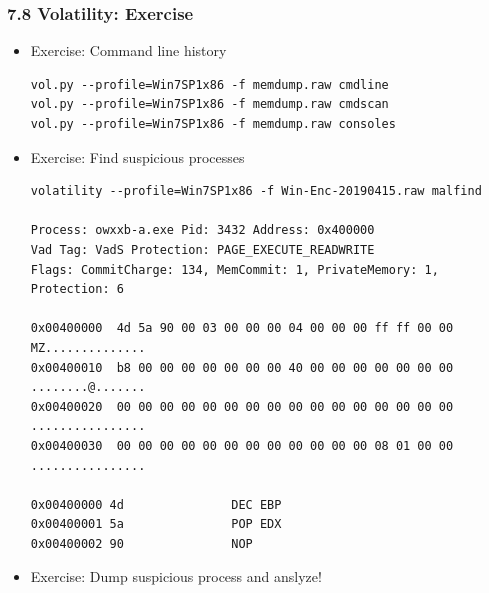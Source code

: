 \begin{frame}[fragile]
  \frametitle{7.8 Volatility: Exercise}
    \begin{itemize}
        \item Exercise: Command line history
    \begin{lstlisting}[basicstyle=\tiny]
vol.py --profile=Win7SP1x86 -f memdump.raw cmdline
vol.py --profile=Win7SP1x86 -f memdump.raw cmdscan
vol.py --profile=Win7SP1x86 -f memdump.raw consoles
    \end{lstlisting}
        \item Exercise: Find suspicious processes
    \begin{lstlisting}[basicstyle=\tiny]
volatility --profile=Win7SP1x86 -f Win-Enc-20190415.raw malfind

Process: owxxb-a.exe Pid: 3432 Address: 0x400000
Vad Tag: VadS Protection: PAGE_EXECUTE_READWRITE
Flags: CommitCharge: 134, MemCommit: 1, PrivateMemory: 1, Protection: 6

0x00400000  4d 5a 90 00 03 00 00 00 04 00 00 00 ff ff 00 00   MZ..............
0x00400010  b8 00 00 00 00 00 00 00 40 00 00 00 00 00 00 00   ........@.......
0x00400020  00 00 00 00 00 00 00 00 00 00 00 00 00 00 00 00   ................
0x00400030  00 00 00 00 00 00 00 00 00 00 00 00 08 01 00 00   ................

0x00400000 4d               DEC EBP
0x00400001 5a               POP EDX
0x00400002 90               NOP
    \end{lstlisting}
        \item Exercise: Dump suspicious process and anslyze!
    \end{itemize}
\end{frame}







